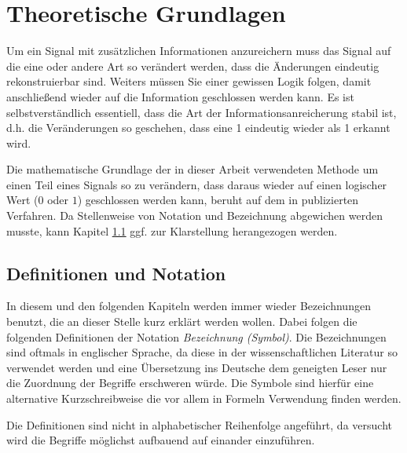 \chapter{Theoretische Grundlagen}
\label{ch:theorie}

Um ein Signal mit zus\"atzlichen Informationen anzureichern muss das Signal auf die eine oder andere Art so ver\"andert werden, dass die Änderungen eindeutig rekonstruierbar sind. Weiters m\"ussen Sie einer gewissen Logik folgen, damit anschlie{\ss}end wieder auf die Information geschlossen werden kann. Es ist selbstverst\"andlich essentiell, dass die Art der Informationsanreicherung stabil ist, d.h. die Ver\"anderungen so geschehen, dass eine 1 eindeutig wieder als 1 erkannt wird.
	
Die mathematische Grundlage der in dieser Arbeit verwendeten Methode um einen Teil eines Signals so zu verändern, dass daraus wieder auf einen logischer Wert ($0$ oder $1$) geschlossen werden kann, beruht auf dem in \cite{xiang2007robust} publizierten Verfahren. Da Stellenweise von Notation und Bezeichnung abgewichen werden musste, kann Kapitel \ref{sec:definitionen} ggf. zur Klarstellung herangezogen werden.

\section{Definitionen und Notation}
\label{sec:definitionen}

In diesem und den folgenden Kapiteln werden immer wieder Bezeichnungen benutzt, die an dieser Stelle kurz erkl\"art werden wollen. Dabei folgen die folgenden Definitionen der Notation \textit{Bezeichnung (Symbol)}. Die Bezeichnungen sind oftmals in englischer Sprache, da diese in der wissenschaftlichen Literatur so verwendet werden und eine Übersetzung ins Deutsche dem geneigten Leser nur die Zuordnung der Begriffe erschweren w\"urde. Die Symbole sind hierf\"ur eine alternative Kurzschreibweise die vor allem in Formeln Verwendung finden werden. 

Die Definitionen sind nicht in alphabetischer Reihenfolge angeführt, da versucht wird die Begriffe möglichst aufbauend auf einander einzuführen. 

